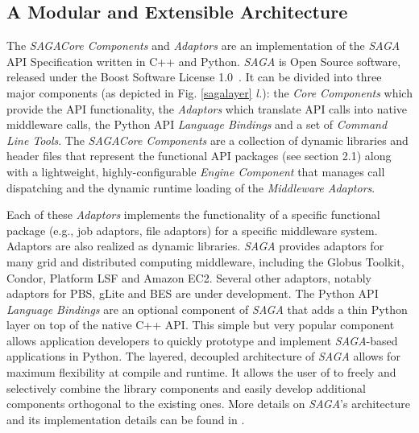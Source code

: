 \documentclass[a4paper,10pt]{article}
\newcommand{\I}[1]{\textit{#1}}
\newcommand{\sagaspec}{\textit{SAGA}\xspace}
\newcommand{\sagaimpl}{\textit{SAGA}\xspace}
\newcommand{\spec}{\sagaspec}
\newcommand{\impl}{\sagaimpl}
\begin{document}
\subsection*{A Modular and Extensible Architecture}

The \impl \I{Core Components} and \I{Adaptors} are an implementation
of the \spec API Specification written in C++ and Python. \impl is
Open Source software, released under the Boost Software
License 1.0~\cite{boost_license_web}. It can be divided into
three major components (as depicted in Fig. \ref{sagalayer} \I{l.}):
the \I{Core Components} which provide the API functionality, the
\I{Adaptors} which translate API calls into native middleware calls,
the Python API \I{Language Bindings} and a set of \I{Command Line
  Tools}. The \impl \I{Core Components} are a collection of dynamic
libraries and header files that represent the functional API packages
(see section 2.1) along with a lightweight, highly-configurable
\I{Engine Component} that manages call dispatching and the dynamic
runtime loading of the \I{Middleware Adaptors}.



Each of these \I{Adaptors} implements the functionality of a specific
functional package (e.g., job adaptors, file adaptors) for a specific
middleware system. Adaptors are also realized as dynamic
libraries. \impl provides adaptors for many grid and distributed
computing middleware, including the Globus Toolkit, Condor, Platform
LSF and Amazon EC2. Several other adaptors, notably adaptors for PBS,
gLite and BES are under development. The Python API \I{Language
  Bindings} are an optional component of \impl that adds a thin Python
layer on top of the native C++ API. This simple but very popular
component allows application developers to quickly prototype and
implement \impl-based applications in Python.  The layered, decoupled
architecture of \impl allows for maximum flexibility at compile and
runtime. It allows the user of to freely and selectively combine the
library components and easily develop additional components orthogonal
to the existing ones. More details on \impl's architecture and its
implementation details can be found in \cite{OOPSLA_PAPER}.
\end{document}
